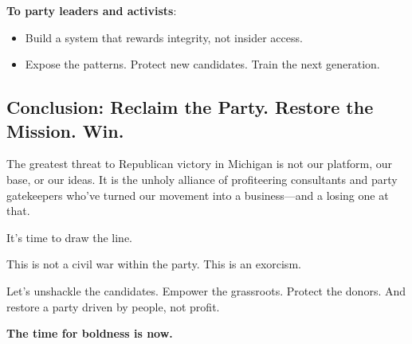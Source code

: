 \textbf{To party leaders and activists}:
\begin{itemize}
\item Build a system that rewards integrity, not insider access.
\item Expose the patterns. Protect new candidates. Train the next generation.
\end{itemize}

\subsection{Conclusion: Reclaim the Party. Restore the Mission. Win.}
The greatest threat to Republican victory in Michigan is not our platform, our base, or our ideas. It is the unholy alliance of profiteering consultants and party gatekeepers who’ve turned our movement into a business---and a losing one at that.

It’s time to draw the line.

This is not a civil war within the party. This is an exorcism.

Let’s unshackle the candidates. Empower the grassroots. Protect the donors. And restore a party driven by people, not profit.

\textbf{The time for boldness is now.}

